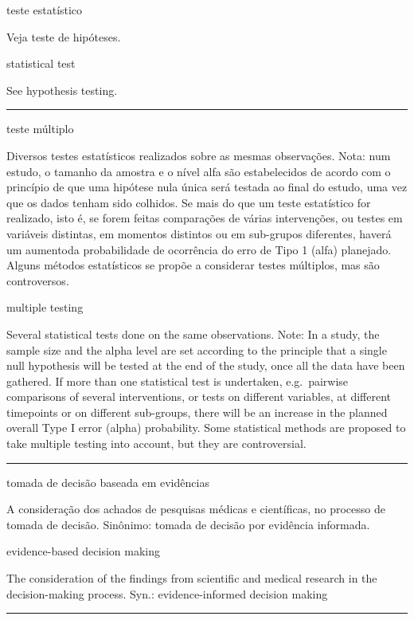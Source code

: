 \documentclass[
]{book}
\begin{document}
teste estatístico

Veja teste de hipóteses.

statistical test

See hypothesis testing.

\begin{center}\rule{0.5\linewidth}{0.5pt}\end{center}

teste múltiplo

Diversos testes estatísticos realizados sobre as mesmas observações. Nota: num estudo, o tamanho da amostra e o nível alfa são estabelecidos de acordo com o princípio de que uma hipótese nula única será testada ao final do estudo, uma vez que os dados tenham sido colhidos. Se mais do que um teste estatístico for realizado, isto é, se forem feitas comparações de várias intervenções, ou testes em variáveis distintas, em momentos distintos ou em sub-grupos diferentes, haverá um aumentoda probabilidade de ocorrência do erro de Tipo 1 (alfa) planejado. Alguns métodos estatísticos se propõe a considerar testes múltiplos, mas são controversos.

multiple testing

Several statistical tests done on the same observations. Note: In a study, the sample size and the alpha level are set according to the principle that a single null hypothesis will be tested at the end of the study, once all the data have been gathered. If more than one statistical test is undertaken, e.g.~pairwise comparisons of several interventions, or tests on different variables, at different timepoints or on different sub-groups, there will be an increase in the planned overall Type I error (alpha) probability. Some statistical methods are proposed to take multiple testing into account, but they are controversial.

\begin{center}\rule{0.5\linewidth}{0.5pt}\end{center}

tomada de decisão baseada em evidências

A consideração dos achados de pesquisas médicas e científicas, no processo de tomada de decisão. Sinônimo: tomada de decisão por evidência informada.

evidence-based decision making

The consideration of the findings from scientific and medical research in the decision-making process. Syn.: evidence-informed decision making

\begin{center}\rule{0.5\linewidth}{0.5pt}\end{center}
\end{document}
